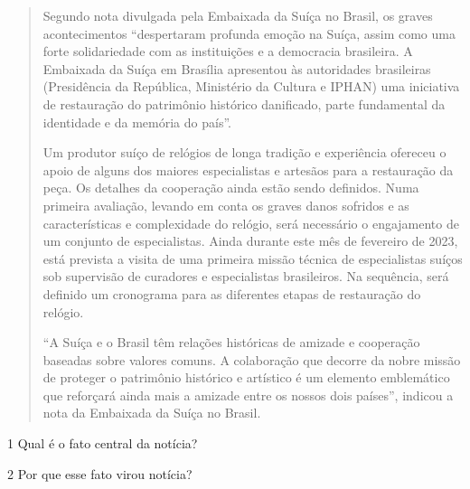 \begin{quote}
Segundo nota divulgada pela Embaixada da Suíça no Brasil, os graves
acontecimentos ``despertaram profunda emoção na Suíça, assim como uma
forte solidariedade com as instituições e a democracia brasileira. A
Embaixada da Suíça em Brasília apresentou às autoridades brasileiras
(Presidência da República, Ministério da Cultura e IPHAN) uma iniciativa
de restauração do patrimônio histórico danificado, parte fundamental da
identidade e da memória do país''.

Um produtor suíço de relógios de longa tradição e experiência ofereceu o
apoio de alguns dos maiores especialistas e artesãos para a restauração
da peça. Os detalhes da cooperação ainda estão sendo definidos. Numa
primeira avaliação, levando em conta os graves danos sofridos e as
características e complexidade do relógio, será necessário o engajamento
de um conjunto de especialistas. Ainda durante este mês de fevereiro de
2023, está prevista a visita de uma primeira missão técnica de
especialistas suíços sob supervisão de curadores e especialistas
brasileiros. Na sequência, será definido um cronograma para as
diferentes etapas de restauração do relógio.

``A Suíça e o Brasil têm relações históricas de amizade e cooperação
baseadas sobre valores comuns. A colaboração que decorre da nobre missão
de proteger o patrimônio histórico e artístico é um elemento emblemático
que reforçará ainda mais a amizade entre os nossos dois países'',
indicou a nota da Embaixada da Suíça no Brasil.

\end{quote}

\num{1} Qual é o fato central da notícia?



\num{2} Por que esse fato virou notícia?


